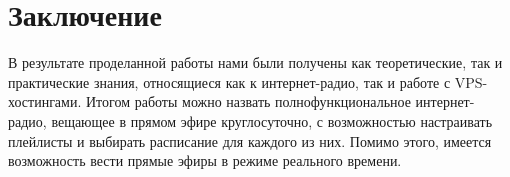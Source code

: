 \chapter{Заключение}

В результате проделанной работы нами были получены как теоретические, так и практические знания, относящиеся как к интернет-радио, так и работе с VPS-хостингами. Итогом работы можно назвать полнофункциональное интернет-радио, вещающее в прямом эфире круглосуточно, с возможностью настраивать плейлисты и выбирать расписание для каждого из них. Помимо этого, имеется возможность вести прямые эфиры в режиме реального времени.